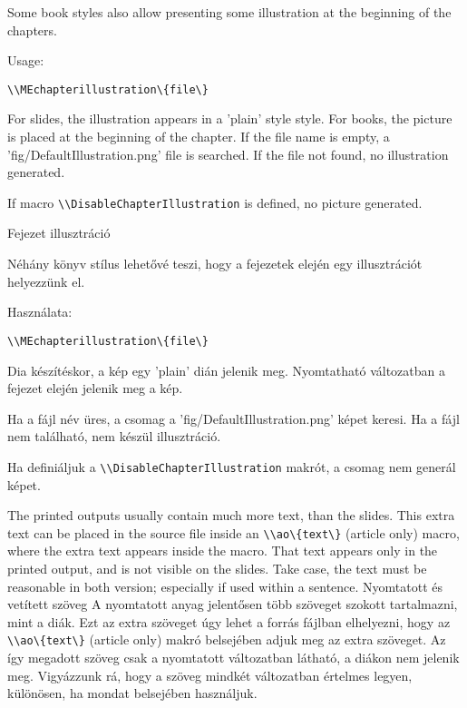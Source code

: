 {
Some book styles also allow presenting some illustration at the beginning of the chapters.
\par Usage:\par
\noindent\lstinline|\\MEchapterillustration\{file\}|

\noindent For slides, the illustration appears in a 'plain' style style.
For books, the picture is placed at the beginning of the chapter.
If the file name is empty, a 'fig/DefaultIllustration.png' file is searched.
If the file not found, no illustration generated.

If macro \lstinline|\\DisableChapterIllustration| is defined, no picture generated.

}
{Fejezet illusztráció}
{
Néhány könyv stílus lehetővé teszi, hogy a fejezetek elején egy illusztrációt helyezzünk el.
\par Használata:\par
\noindent\lstinline|\\MEchapterillustration\{file\}|

\noindent Dia készítéskor, a kép egy 'plain' dián jelenik meg.
Nyomtatható változatban a fejezet elején jelenik meg a kép.

Ha a fájl név üres, a csomag a 'fig/DefaultIllustration.png' képet keresi.
Ha a fájl nem található, nem készül illusztráció.

Ha definiáljuk a  \lstinline|\\DisableChapterIllustration|  makrót,
a csomag nem generál képet. 
}


{
The printed outputs usually contain much more text, than the slides.
This extra text can be placed in the source file
inside an \lstinline|\\ao\{text\}| (article only) macro,
where the extra text appears inside the macro.
That text appears only in the printed output, and is not visible on the slides.
Take case, the text must be reasonable in both version;
especially if used within a sentence.
}
{Nyomtatott és vetített szöveg}
{A nyomtatott anyag jelentősen több szöveget szokott tartalmazni, mint
a diák. Ezt az extra szöveget úgy lehet a forrás fájlban elhelyezni,
hogy az \lstinline|\\ao\{text\}| (article only) makró belsejében adjuk meg az extra szöveget.
Az így megadott szöveg csak a nyomtatott változatban látható, 
a diákon nem jelenik meg. 
Vigyázzunk rá, hogy a szöveg mindkét változatban értelmes legyen,
különösen, ha mondat belsejében használjuk.
}



